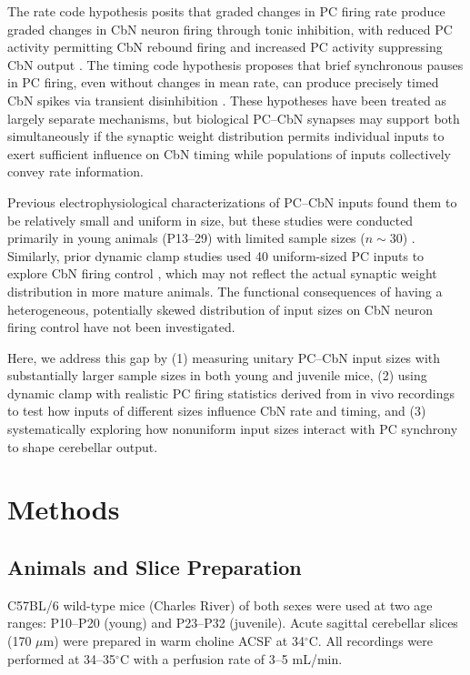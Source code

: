 \documentclass[12pt]{article}
\begin{document}
The rate code hypothesis posits that graded changes in PC firing rate produce graded changes in CbN neuron firing through tonic inhibition, with reduced PC activity permitting CbN rebound firing and increased PC activity suppressing CbN output \citep{gauck2000control}. The timing code hypothesis proposes that brief synchronous pauses in PC firing, even without changes in mean rate, can produce precisely timed CbN spikes via transient disinhibition \citep{person2012purkinje, bengtsson2011purkinje}. These hypotheses have been treated as largely separate mechanisms, but biological PC--CbN synapses may support both simultaneously if the synaptic weight distribution permits individual inputs to exert sufficient influence on CbN timing while populations of inputs collectively convey rate information.

Previous electrophysiological characterizations of PC--CbN inputs found them to be relatively small and uniform in size, but these studies were conducted primarily in young animals (P13--29) with limited sample sizes ($n \sim 30$) \citep{person2012purkinje, telgkamp2004maintenance}. Similarly, prior dynamic clamp studies used 40 uniform-sized PC inputs to explore CbN firing control \citep{gauck2000control}, which may not reflect the actual synaptic weight distribution in more mature animals. The functional consequences of having a heterogeneous, potentially skewed distribution of input sizes on CbN neuron firing control have not been investigated.

Here, we address this gap by (1) measuring unitary PC--CbN input sizes with substantially larger sample sizes in both young and juvenile mice, (2) using dynamic clamp with realistic PC firing statistics derived from in vivo recordings to test how inputs of different sizes influence CbN rate and timing, and (3) systematically exploring how nonuniform input sizes interact with PC synchrony to shape cerebellar output.

\section{Methods}

\subsection{Animals and Slice Preparation}

C57BL/6 wild-type mice (Charles River) of both sexes were used at two age ranges: P10--P20 (young) and P23--P32 (juvenile). Acute sagittal cerebellar slices (170 $\mu$m) were prepared in warm choline ACSF at 34$^\circ$C. All recordings were performed at 34--35$^\circ$C with a perfusion rate of 3--5 mL/min.
\end{document}
